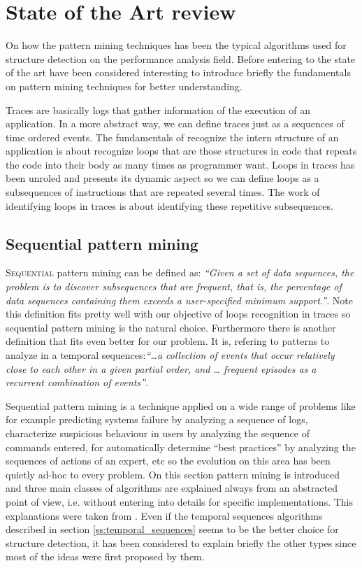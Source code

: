 \chapter{State of the Art review}

On how the pattern mining techniques has been the typical algorithms used for
structure detection on the performance analysis field. Before entering to the 
state of the art have been considered interesting to introduce briefly the 
fundamentals on pattern mining techniques for better understanding.

Traces are basically logs that gather information of the execution of an
application. In a more abstract way, we can define traces just as a sequences
of time ordered events. The fundamentals of recognize the intern structure of an
application is about recognize loops that are those structures in code that
repeats the code into their body as many times as programmer want. Loops in
traces has been unroled and presents its dynamic aspect so we can define loops
as a subsequences of instructions that are repeated several times. The work of
identifying loops in traces is about identifying these repetitive subsequences.

\section{Sequential pattern mining}\label{pattern_mining}

\lettrine{S}{equential} pattern mining can be defined as: \textit{``Given a set of data sequences, the
problem is to discover subsequences that are frequent, that is, the percentage of
data sequences containing them exceeds a user-specified minimum support.''}. Note 
this definition fits pretty well with our objective of loops recognition in traces 
so sequential pattern mining is the natural choice. Furthermore there is another
definition that fits even better for our problem. It is, refering to patterns to
analyze in a temporal sequences:\textit{``\ldots a collection of events that
occur relatively close to each other in a given partial order, and \ldots
frequent episodes as a recurrent combination of events''}.

Sequential pattern mining is a technique applied on a wide range of problems
like for example predicting systems failure by analyzing a sequence of logs,
characterize suspicious behaviour in users by analyzing the sequence of commands
entered, for automatically determine “best practices” by analyzing the sequences
of actions of an expert, etc so the evolution on this area has been quietly
ad-hoc to every problem. On this section pattern mining is introduced and three
main classes of algorithms are explained always from an abstracted point of
view, i.e. without entering into details for specific implementations. This
explanations were taken from \cite{mooney2013sequential}. Even if the temporal
sequences algorithms described in section \ref{ss:temporal_sequences} seems to
be the better choice for structure detection, it has been considered to explain
briefly the other types since most of the ideas were first proposed by them.

